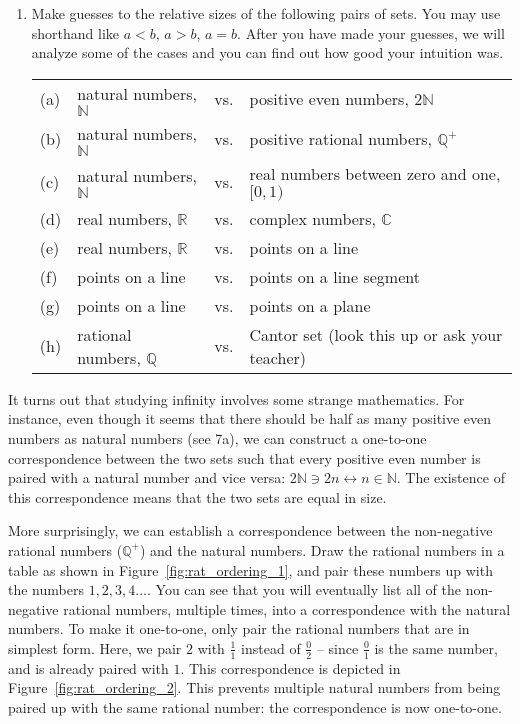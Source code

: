 \documentclass[../gatm.tex]{subfiles}
\begin{document}
\begin{enumerate}
\setcounter{enumi}{\value{inf_problem_i}}
\item Make guesses to the relative sizes of the following pairs of sets. You may use shorthand like $a < b$, $a > b$, $a = b$. After you have made your guesses, we will analyze some of the cases and you can find out how good your intuition was.

\begin{tabular}{llll} %
(a) & natural numbers, $\mathbb{N}$ & vs. & positive even numbers, $2\mathbb{N}$ \\
(b) & natural numbers, $\mathbb{N}$ & vs. & positive rational numbers, $\mathbb{Q}^+$ \\
(c) & natural numbers, $\mathbb{N}$ & vs. & real numbers between zero and one, $[0,1)$ \\
(d) & real numbers, $\mathbb{R}$ & vs. & complex numbers, $\mathbb{C}$ \\
(e) & real numbers, $\mathbb{R}$ & vs. & points on a line \\
(f) & points on a line & vs. & points on a line segment \\
(g) & points on a line & vs. & points on a plane \\
(h) & rational numbers, $\mathbb{Q}$ & vs. & Cantor set (look this up or ask your teacher) \\ %
\end{tabular}

\setcounter{inf_problem_i}{\value{enumi}}
\end{enumerate}


It turns out that studying infinity involves some strange mathematics. For instance, even though it seems that there should be half as many positive even numbers as natural numbers (see 7a), we can construct a one-to-one correspondence between the two sets such that every positive even number is paired with a natural number and vice versa: $2\mathbb{N} \ni 2n \leftrightarrow n \in \mathbb{N}$. The existence of this correspondence means that the two sets are equal in size. %

More surprisingly, we can establish a correspondence between the non-negative rational numbers ($\mathbb{Q}^+$) and the natural numbers. Draw the rational numbers in a table as shown in Figure~\ref{fig:rat_ordering_1}, and pair these numbers up with the numbers $1,2,3,4$.... You can see that you will eventually list all of the non-negative rational numbers, multiple times, into a correspondence with the natural numbers. To make it one-to-one, only pair the rational numbers that are in simplest form. Here, we pair $2$ with $\frac{1}{1}$ instead of $\frac{0}{2}$ -- since $\frac{0}{1}$ is the same number, and is already paired with $1$. This correspondence is depicted in Figure~\ref{fig:rat_ordering_2}. This prevents multiple natural numbers from being paired up with the same rational number: the correspondence is now one-to-one.
\end{document}
